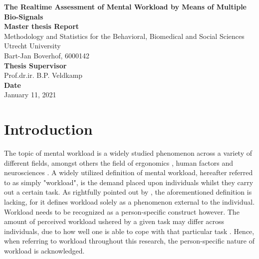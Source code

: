 \documentclass[12pt]{article}
\begin{document}
\begin{titlepage}
\begin{center}
\LARGE{\textbf{The Realtime Assessment of Mental Workload by Means of Multiple Bio-Signals}}\\
\vspace*{2\baselineskip}
\Large{\textbf{Master thesis Report}}\\
Methodology and Statistics for the Behavioral, Biomedical and Social Sciences\\
\vspace*{1\baselineskip}
Utrecht University\\
\vspace*{4\baselineskip}
{Bart-Jan Boverhof, 6000142}\\
\vspace*{1\baselineskip}
{\textbf{Thesis Supervisor}}\\
Prof.dr.ir. B.P. Veldkamp\\
\vspace*{1\baselineskip}
{\textbf{Date}}\\
January 11, 2021\\
\vspace*{1\baselineskip}
\end{center}
\end{titlepage}

\section{Introduction}
The topic of mental workload is a widely studied phenomenon across a variety of different fields, amongst others the field of ergonomics \cite{young2015state}, human factors \cite{pretorius2007development} and neurosciences \cite{shuggi2017mental}. A widely utilized definition of mental workload, hereafter referred to as simply "workload", is the demand placed upon individuals whilst they carry out a certain task. As rightfully pointed out by , the aforementioned definition is lacking, for it defines workload solely as a phenomenon external to the individual. Workload needs to be recognized as a person-specific construct however. The amount of perceived workload ushered by a given task may differ across individuals, due to how well one is able to cope with that particular task \cite{de1996measurement}. Hence, when referring to workload throughout this research, the person-specific nature of workload is acknowledged.
\end{document}
